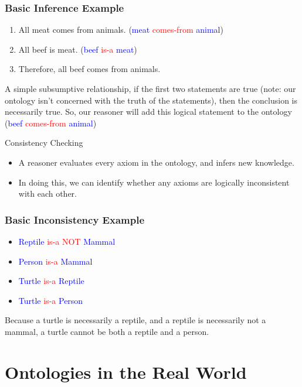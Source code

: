 \documentclass[aspectratio=169]{beamer} %
\begin{document}
\begin{frame}
\frametitle{Basic Inference Example}

\begin{enumerate}
  \item All meat comes from animals. (\textcolor{blue}{meat}
  \textcolor{red}{comes-from} \textcolor{blue}{animal})
  \item All beef is meat. (\textcolor{blue}{beef} \textcolor{red}{is-a}
  \textcolor{blue}{meat})
  \item Therefore, all beef comes from animals.
\end{enumerate}
A simple subsumptive relationship, if the first two statements are true (note: our
ontology isn't concerned with the truth of the statements), then the conclusion
is necessarily true. So, our reasoner will add this logical statement to the
ontology (\textcolor{blue}{beef} \textcolor{red}{comes-from} \textcolor{blue}{animal})
\end{frame}

\begin{frame}{Consistency Checking}
  \begin{itemize}
    \item A reasoner evaluates every axiom in the ontology, and infers new knowledge.
    \item In doing this, we can identify whether any axioms are logically inconsistent with each other.
  \end{itemize}
\end{frame}

\begin{frame}
\frametitle{Basic Inconsistency Example}

\begin{itemize}
\item \textcolor{blue}{Reptile} \textcolor{red}{is-a NOT} \textcolor{blue}{Mammal}
\item \textcolor{blue}{Person} \textcolor{red}{is-a} \textcolor{blue}{Mammal}
\item \textcolor{blue}{Turtle} \textcolor{red}{is-a} \textcolor{blue}{Reptile}
\item \textcolor{blue}{Turtle} \textcolor{red}{is-a} \textcolor{blue}{Person}
\end{itemize}

Because a turtle is necessarily a reptile, and a reptile is necessarily not a
mammal, a turtle cannot be both a reptile and a person. 
\end{frame}

\section{Ontologies in the Real World}
\end{document}
